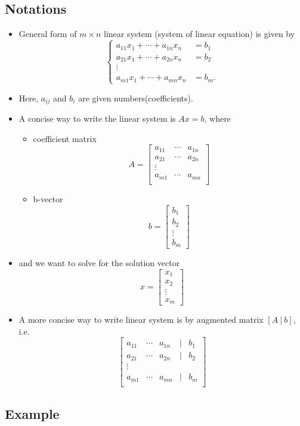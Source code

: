 \documentclass[11pt]{amsart}
\begin{document}
\subsection{Notations}
\begin{itemize}
 \item General form of $m\times n$ linear system (system of linear equation) is
given by
$$
\left\{
\begin{array}
 {ll}
 a_{11} x_{1} + \cdots + a_{1n} x_{n} &= b_{1} \\
 a_{21} x_{1} + \cdots + a_{2n} x_{n} &= b_{2} \\
 \vdots \\
 a_{m1} x_{1} + \cdots + a_{mn} x_{n} &= b_{m}.
\end{array}
\right.
$$
\item 
Here, $a_{ij}$ and $b_{i}$ are given numbers(coefficients). 
\item A concise way to write the linear system is $A x = b$, where
\begin{itemize}
 \item coefficient matrix
$$ A = 
\begin{bmatrix}
 a_{11} & \cdots & a_{1n} \\
 a_{21} & \cdots & a_{2n} \\
 \vdots\\
 a_{m1} & \cdots & a_{mn} \\
\end{bmatrix}
$$
\item b-vector
$$ b = 
\begin{bmatrix}
 b_{1}\\b_{2}\\ \vdots\\b_{m}
\end{bmatrix}
$$
\end{itemize}
\item 
and we want to solve for the solution vector
$$x = 
\begin{bmatrix}
 x_{1}\\ x_{2}\\ \vdots\\ x_{m}
\end{bmatrix}
$$

\item A more concise way to write linear system is by augmented matrix 
$[A\  |\  b ]$, i.e. 
$$\begin{bmatrix}
 a_{11} & \cdots & a_{1n} & | & b_{1} \\
 a_{21} & \cdots & a_{2n} & | & b_{2} \\
 \vdots\\
 a_{m1} & \cdots & a_{mn} & | & b_{m} \\
\end{bmatrix}
$$



\end{itemize}
\subsection{Example}
\end{document}
